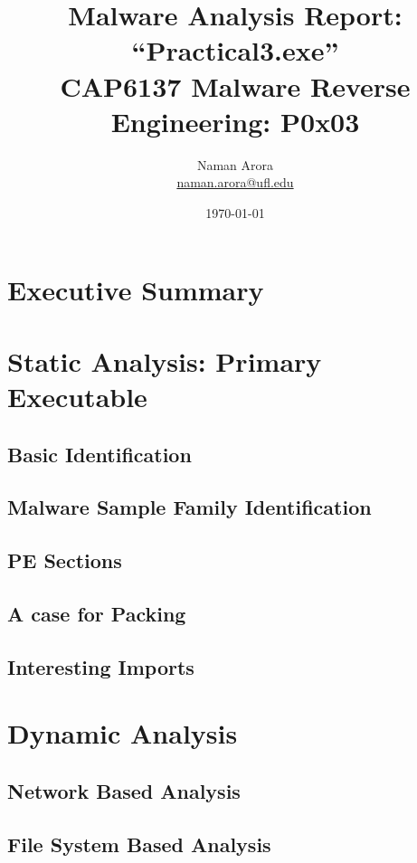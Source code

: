 \documentclass[10pt,a4paper]{article}
\begin{document}

\title{Malware Analysis Report: ``Practical3.exe''\\ \vspace{-8pt} {\large CAP6137 Malware Reverse Engineering: P0x03}}
\author{{Naman Arora \\ \vspace{-10pt}\small \href{mailto:naman.arora@ufl.edu}{naman.arora@ufl.edu}}}
\date{\today}

\maketitle
\newpage
\tableofcontents
\newpage
\section{Executive Summary}

\newpage

\section{Static Analysis: Primary Executable}
	\subsection{Basic Identification}
	\subsection{Malware Sample Family Identification}
	\subsection{PE Sections}
	\subsection{A case for Packing}
	\subsection{Interesting Imports}

\section{Dynamic Analysis}
	\subsection{Network Based Analysis}
	\subsection{File System Based Analysis}
\end{document}
